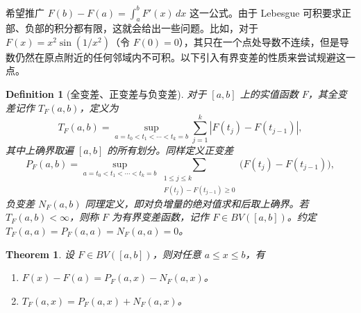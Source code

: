 \documentclass[12pt,letterpaper,twoside,openright]{ctexbook}
\theoremstyle{bluehead}
\newtheorem{theorem}{Theorem}
\theoremstyle{olivehead}
\newtheorem{definition}{Definition}
\theoremstyle{orangehead}
\theoremstyle{redremark}
\begin{document}
希望推广 $F(b)-F(a)=\int_a^b F'(x)\,dx$ 这一公式。由于 Lebesgue 可积要求正部、负部的积分都有限，这就会给出一些问题。比如，对于 $F(x)=x^2\sin(1/x^2)$（令 $F(0)=0$），其只在一个点处导数不连续，但是导数仍然在原点附近的任何邻域内不可积。以下引入有界变差的性质来尝试规避这一点。

\begin{definition}[全变差、正变差与负变差]
对于 $[a,b]$ 上的实值函数 $F$，其全变差记作 $T_F(a,b)$，定义为
\[
T_F(a,b)=\sup_{a=t_0<t_1<\cdots<t_k=b}\sum_{j=1}^k|F(t_j)-F(t_{j-1})|,
\]
其中上确界取遍 $[a,b]$ 的所有划分。同样定义正变差
\[
P_F(a,b)=\sup_{a=t_0<t_1<\cdots<t_k=b}
\sum_{\substack{1\leq j\leq k\\F(t_j)-F(t_{j-1})\geq0}}
\bigl(F(t_j)-F(t_{j-1})\bigr),
\]
负变差 $N_F(a,b)$ 同理定义，即对负增量的绝对值求和后取上确界。若 $T_F(a,b)<\infty$，则称 $F$ 为有界变差函数，记作 $F\in BV([a,b])$。约定 $T_F(a,a)=P_F(a,a)=N_F(a,a)=0$。
\end{definition}

\begin{theorem}\label{thm:variation-positive-negative}
设 $F\in BV([a,b])$，则对任意 $a\leq x\leq b$，有
\begin{enumerate}
\item[(1)] $F(x)-F(a)=P_F(a,x)-N_F(a,x)$。
\item[(2)] $T_F(a,x)=P_F(a,x)+N_F(a,x)$。
\end{enumerate}
\end{theorem}
\end{document}
